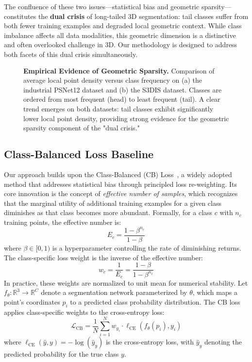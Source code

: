 \documentclass[preprint,12pt]{elsarticle}
\begin{document}
The confluence of these two issues---statistical bias and geometric sparsity---constitutes the \textbf{dual crisis} of long-tailed 3D segmentation: tail classes suffer from both fewer training examples and degraded local geometric context. While class imbalance affects all data modalities, this geometric dimension is a distinctive and often overlooked challenge in 3D. Our methodology is designed to address both facets of this dual crisis simultaneously.

\begin{figure}[htbp]
    \centering
    \caption{\textbf{Empirical Evidence of Geometric Sparsity.} Comparison of average local point density versus class frequency on (a) the industrial PSNet12 dataset and (b) the S3DIS dataset. Classes are ordered from most frequent (head) to least frequent (tail). A clear trend emerges on both datasets: tail classes exhibit significantly lower local point density, providing strong evidence for the geometric sparsity component of the "dual crisis."}
    \label{fig:density_analysis}
\end{figure}

\subsection{Class-Balanced Loss Baseline}
\label{sec:cb_loss_baseline}
Our approach builds upon the Class-Balanced (CB) Loss~\cite{cui2019class}, a widely adopted method that addresses statistical bias through principled loss re-weighting. Its core innovation is the concept of \textit{effective number of samples}, which recognizes that the marginal utility of additional training examples for a given class diminishes as that class becomes more abundant. Formally, for a class \(c\) with \(n_c\) training points, the effective number is:
\begin{equation}
\label{eq:cb_effective}
E_c = \frac{1 - \beta^{n_c}}{1 - \beta}
\end{equation}
where \(\beta \in [0,1)\) is a hyperparameter controlling the rate of diminishing returns. The class-specific loss weight is the inverse of the effective number:
\begin{equation}
\label{eq:cb_weight}
w_c = \frac{1}{E_c} = \frac{1-\beta}{1-\beta^{n_c}}
\end{equation}
In practice, these weights are normalized to unit mean for numerical stability. Let \(f_\theta : \mathbb{R}^3 \to \mathbb{R}^C\) denote a segmentation network parameterized by \(\theta\), which maps a point's coordinates \(p_i\) to a predicted class probability distribution. The CB loss applies class-specific weights to the cross-entropy loss:
\begin{equation}
\label{eq:cb_loss}
\mathcal{L}_{\text{CB}} = \frac{1}{N} \sum_{i=1}^{N} w_{y_i} \cdot \ell_{\text{CE}}(f_\theta(p_i), y_i)
\end{equation}
where \(\ell_{\text{CE}}(\hat{y}, y) = -\log(\hat{y}_y)\) is the cross-entropy loss, with \(\hat{y}_y\) denoting the predicted probability for the true class \(y\).
\end{document}
